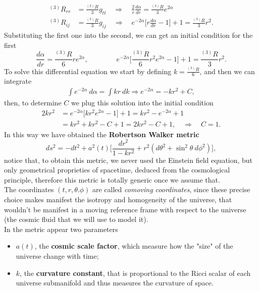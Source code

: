 \begin{align*}
    ^{(3)}R_{rr}&=\frac{^{(3)}R}{3}g_{tt}\quad\Rightarrow\quad\boxed{\frac{2}{r}\frac{d\alpha}{dr}=\frac{^{(3)}R}{3}e^{2\alpha}}\\ ^{(3)}R_{ij}&=\frac{^{(3)}R}{3}g_{ij}\quad\Rightarrow\quad \boxed{e^{-2\alpha}\bigg[r\frac{d\alpha}{dr}-1\bigg]+1=\frac{^{(3)}R}{3}r^2}.
\end{align*}
Substituting the first one into the second, we can get an initial condition for the first
\begin{equation}
    \frac{d\alpha}{dr}=\frac{^{(3)}R}{6}re^{2\alpha},\qquad\qquad e^{-2\alpha}\bigg[\frac{^{(3)}R}{6}r^2e^{2\alpha}-1\bigg]+1=\frac{^{(3)}R}{3}r^2.
\end{equation}
To solve this differential equation we start by defining $k=\frac{^{(3)}R}{6}$, and then we can integrate
\begin{align}
    \int e^{-2\alpha}\ d\alpha=\int kr\ dk \Rightarrow e^{-2\alpha}=-kr^2+C,
\end{align}
then, to determine $C$ we plug this solution into the initial condition
\begin{align*}
    2kr^2&=e^{-2\alpha}\bigg[kr^2e^{2\alpha}-1\bigg]+1=kr^2-e^{-2\alpha}+1\\
       &=kr^2+kr^2-C+1=2kr^2-C+1,\quad \Rightarrow\quad C=1.
\end{align*}    
In this way we have obtained the \textbf{Robertson Walker metric}
\begin{equation}\label{RWMetric}
    ds^2=-dt^2+a^2(t)\bigg[\frac{dr^2}{1-kr^2}+r^2(d\theta^2+\sin^2\theta\ d\phi^2)\bigg],
\end{equation}
notice that, to obtain this metric, we never used the Einstein field equation, but only geometrical proprieties of spacetime, deduced from the cosmological principle, therefore this metric is totally generic once we assume that.\\
The coordinates $(t,r,\theta.\phi)$ are called \emph{comoving coordinates}, since these precise choice makes manifest the isotropy and homogeneity of the universe, that wouldn't be manifest in a moving reference frame with respect to the universe (the cosmic fluid that we will use to model it).\\
In the metric appear two parameters
\begin{itemize}
    \item $a(t)$, the \textbf{cosmic scale factor}, which measure how the "size" of the universe change with time;
    \item $k$, the \textbf{curvature constant}, that is proportional to the Ricci scalar of each universe submanifold and thus measures the curvature of space.
\end{itemize}
